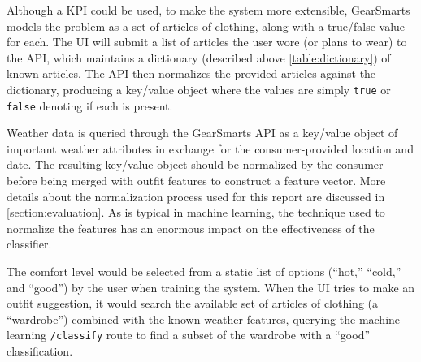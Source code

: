 Although a KPI could be used, to make the system more extensible, GearSmarts models the problem as a set of
articles of clothing, along with a true/false value for each. The UI will submit a list of articles the user wore (or
plans to wear) to the API, which maintains a dictionary (described above \ref{table:dictionary}) of known articles. The
API then normalizes the provided articles against the dictionary, producing a key/value object where the values are
simply \texttt{true} or \texttt{false} denoting if each is present.

Weather data is queried through the GearSmarts API as a key/value object of important
weather attributes in exchange for the consumer-provided location and date. The resulting key/value object should be
normalized by the consumer before being merged with outfit features to construct a feature vector. More details about
the normalization process used for this report are discussed in \ref{section:evaluation}. As is typical in
machine learning, the technique used to normalize the features has an enormous impact on the effectiveness of the
classifier.

The comfort level would be selected from a static list of options (``hot,'' ``cold,'' and ``good'') by the user when
training the system. When the UI tries to make an outfit suggestion, it would search the available set of articles of
clothing (a ``wardrobe'') combined with the known weather features, querying the machine learning \texttt{/classify}
route to find a subset of the wardrobe with a ``good'' classification.
